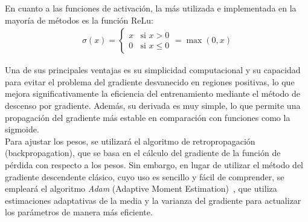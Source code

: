 \documentclass[11pt]{book}
\theoremstyle{plain} %
\theoremstyle{definition} %
\begin{document}
En cuanto a las funciones de activación, la más utilizada e implementada en la mayoría 
de métodos es la función ReLu:
\begin{align*}
      \sigma(x) = 
      \begin{cases}
         x & \text{si } x > 0 \\
         0 & \text{si } x \leq 0
      \end{cases} = \max(0, x)
\end{align*}

Una de sus principales ventajas es su simplicidad computacional y su capacidad para 
evitar el problema del gradiente desvanecido en regiones positivas, lo que mejora 
significativamente la eficiencia del entrenamiento mediante el método de descenso por 
gradiente. Además, su derivada es muy simple, lo que  permite una propagación del 
gradiente más estable en comparación con funciones como la sigmoide. \\


Para ajustar los pesos, se utilizará el algoritmo de retropropagación (backpropagation), que 
se basa en el cálculo del gradiente de la función de pérdida con respecto a los pesos.
Sin embargo, en lugar de utilizar el método del gradiente descendente clásico, cuyo uso es sencillo 
y fácil de comprender, se empleará el algoritmo \textit{Adam} (Adaptive Moment Estimation)~\cite{KB14}, 
que utiliza estimaciones adaptativas de la media y la varianza del gradiente para actualizar los 
parámetros de manera más eficiente.
\end{document}
